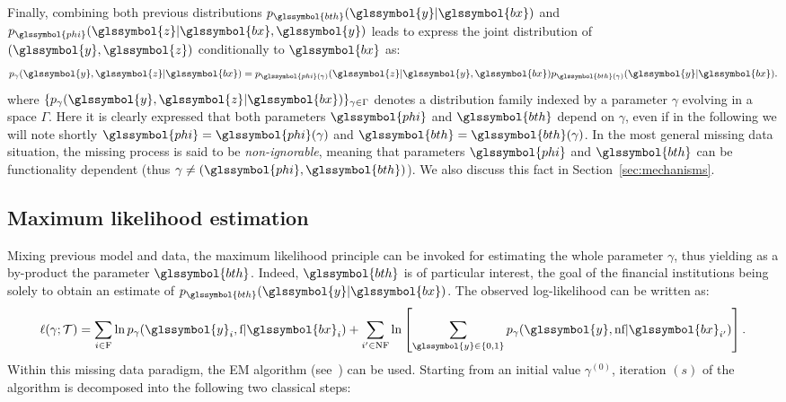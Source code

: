 Finally, combining both previous distributions $p_{\glssymbol{bth}}(\glssymbol{y}|\glssymbol{bx})$ and $p_{\glssymbol{phi}}(\glssymbol{z}|\glssymbol{bx},\glssymbol{y})$ leads to express the joint distribution of $(\glssymbol{y},\glssymbol{z})$ conditionally to $\glssymbol{bx}$ as:
\begin{equation}\label{eq:generative}
p_{\gamma}(\glssymbol{y},\glssymbol{z}|\glssymbol{bx}) = p_{\glssymbol{phi}(\gamma)}(\glssymbol{z}|\glssymbol{y},\glssymbol{bx})p_{\glssymbol{bth}(\gamma)}(\glssymbol{y}|\glssymbol{bx}).
\end{equation}
where $\{p_{\gamma}(\glssymbol{y},\glssymbol{z}|\glssymbol{bx})\}_{\gamma \in \Gamma}$ denotes a distribution family indexed by a parameter $\gamma$ evolving in a space $\Gamma$. Here it is clearly expressed that both parameters $\glssymbol{phi}$ and $\glssymbol{bth}$ depend on $\gamma$, even if in the following we will note shortly $\glssymbol{phi}=\glssymbol{phi}(\gamma)$ and $\glssymbol{bth}=\glssymbol{bth}(\gamma)$. In the most general missing data situation, the missing process is said to be {\it non-ignorable}, meaning that parameters $\glssymbol{phi}$ and $\glssymbol{bth}$ can be functionality dependent (thus $\gamma\neq (\glssymbol{phi},\glssymbol{bth})$). We also discuss this fact in Section~\ref{sec:mechanisms}.

\subsection{Maximum likelihood estimation} 
\label{sec:EM}

Mixing previous model and data, the maximum likelihood principle can be invoked for estimating the whole parameter $\gamma$, thus yielding as a by-product the parameter $\glssymbol{bth}$. Indeed, $\glssymbol{bth}$ is of particular interest, the goal of the financial institutions being solely to obtain an estimate of $p_{\glssymbol{bth}}(\glssymbol{y}|\glssymbol{bx})$. The observed log-likelihood can be written as:
\begin{equation}\label{eq:like.MNAR}
\ell(\gamma;\mathcal{T}) = \sum_{i\in\text{F}}\ln p_{\gamma}(\glssymbol{y}_i,\text{f} | \glssymbol{bx}_i) + \sum_{i'\in\text{NF}} \ln \left[ \sum_{\glssymbol{y}\in\{0,1\}} p_{\gamma}(\glssymbol{y},\text{nf} | \glssymbol{bx}_{i'}) \right].
\end{equation}
Within this missing data paradigm, the EM algorithm (see~\cite{dempster1977maximum}) can be used. Starting from an initial value $\gamma^{(0)}$, iteration $(s)$ of the algorithm is decomposed into the following two classical steps:
